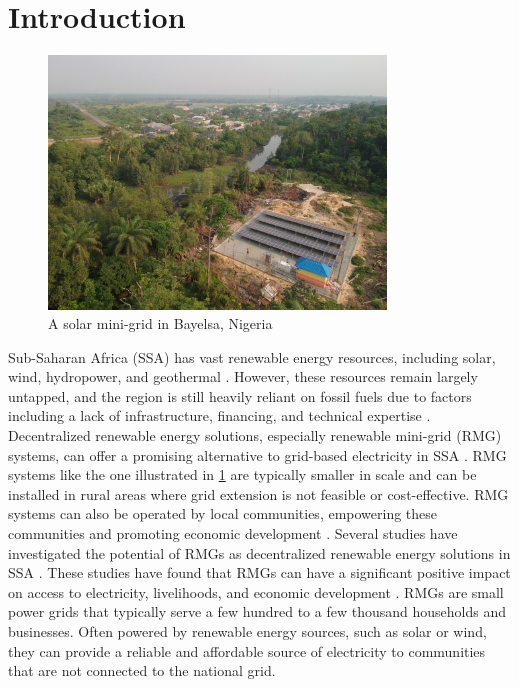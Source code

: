 \section{Introduction}
\label{sec:intro}
\begin{figure}[th]
	\centering
	\includegraphics[width=0.8\textwidth]{images/mini-grid-bayelsa.jpg}
	\caption{A solar mini-grid in Bayelsa, Nigeria}
	\label{fig:mini-grid}
\end{figure}

Sub-Saharan Africa (SSA) has vast renewable energy resources, including solar, wind, hydropower, and geothermal \cite{hafner2018prospects}. However, these resources remain largely untapped, and the region is still heavily reliant on fossil fuels due to factors including a lack of infrastructure, financing, and technical expertise \cite{irena2022renewable}. Decentralized renewable energy solutions, especially renewable mini-grid (RMG) systems, can offer a promising alternative to grid-based electricity in SSA \cite{moro2018ensuring, rasagam2018delivering}. RMG systems like the one illustrated in \cref{fig:mini-grid} are typically smaller in scale and can be installed in rural areas where grid extension is not feasible or cost-effective. RMG systems can also be operated by local communities, empowering these communities and promoting economic development \cite{deshmukh2009role, edwards2018role}.
Several studies have investigated the potential of RMGs as decentralized renewable energy solutions in SSA \cite{rabetanetiarimanana2018pv, okunlola2018assessment, moner2018electrification}. These studies have found that RMGs can have a significant positive impact on access to electricity, livelihoods, and economic development \cite{dawoud2018hybrid}. RMGs are small power grids that typically serve a few hundred to a few thousand households and businesses. Often powered by renewable energy sources, such as solar or wind, they can provide a reliable and affordable source of electricity to communities that are not connected to the national grid.

